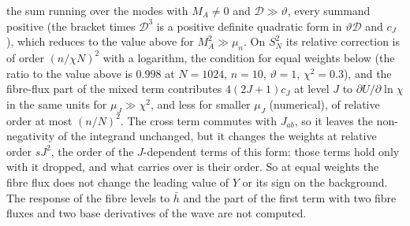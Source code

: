 the sum running over the modes with \(M_A\ne0\) and \(\mathcal D\gg\vartheta\), every summand positive (the bracket times \(\mathcal D^3\) is a positive definite quadratic form in \(\vartheta\mathcal D\) and \(c_J\)), which reduces to the value above for \(M_A^2\gg\mu_n\). On \(S^2_N\) its relative correction is of order \((n/\chi N)^2\) with a logarithm, the condition for equal weights below (the ratio to the value above is \(0.998\) at \(N=1024\), \(n=10\), \(\vartheta=1\), \(\chi^2=0.3\)), and the fibre-flux part of the mixed term contributes \(4(2J+1)c_J\) at level \(J\) to \(\partial U/\partial\ln\chi\) in the same units for \(\mu_J\gg\chi^2\), and less for smaller \(\mu_J\) (numerical), of relative order at most \((n/N)^2\). The cross term commutes with \(J_{ab}\), so it leaves the non-negativity of the integrand unchanged, but it changes the weights at relative order \(sJ^2\), the order of the \(J\)-dependent terms of this form: those terms hold only with it dropped, and what carries over is their order. So at equal weights the fibre flux does not change the leading value of \(Y\) or its sign on the background. The response of the fibre levels to \(\bar h\) and the part of the first term with two fibre fluxes and two base derivatives of the wave are not computed.

